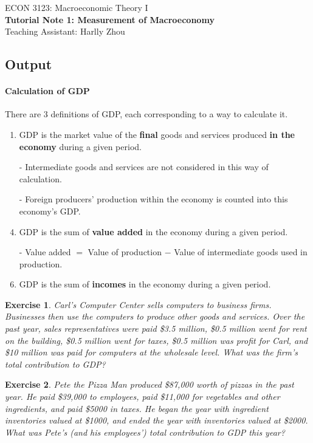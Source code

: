\documentclass[12pt]{article}
\newtheorem{exercise}{Exercise}
\numberwithin{equation}{section}
\begin{document}
\begin{center}
    ECON 3123: Macroeconomic Theory I\\
    {\large \textbf{Tutorial Note 1: Measurement of Macroeconomy}}\\
    Teaching Assistant: Harlly Zhou
\end{center}

\subsection*{Output}
\paragraph{Calculation of GDP}
There are 3 definitions of GDP, each corresponding to a way to calculate it.
\begin{enumerate}[label=(\arabic*)]
    \item GDP is the market value of the \textbf{final} goods and services produced \textbf{in the economy} during a given period.
    \item[-] Intermediate goods and services are not considered in this way of calculation.
    \item[-] Foreign producers' production within the economy is counted into this economy's GDP.
    
    \item GDP is the sum of \textbf{value added} in the economy during a given period.
    \item[-] Value added $=$ Value of production $-$ Value of intermediate goods used in production.

    \item GDP is the sum of \textbf{incomes} in the economy during a given period.
\end{enumerate}

\begin{exercise}
    Carl's Computer Center sells computers to business firms. Businesses then use the computers to produce other goods and services. Over the past year, sales representatives were paid \$3.5 million, \$0.5 million went for rent on the building, \$0.5 million went for taxes, \$0.5 million was profit for Carl, and \$10 million was paid for computers at the wholesale level. What was the firm's total contribution to GDP?
\end{exercise}

\begin{exercise}
    Pete the Pizza Man produced \$87,000 worth of pizzas in the past year. He paid \$39,000 to employees, paid \$11,000 for vegetables and other ingredients, and paid \$5000 in taxes. He began the year with ingredient inventories valued at \$1000, and ended the year with inventories valued at \$2000. What was Pete's (and his employees') total contribution to GDP this year?
\end{exercise}
\end{document}
